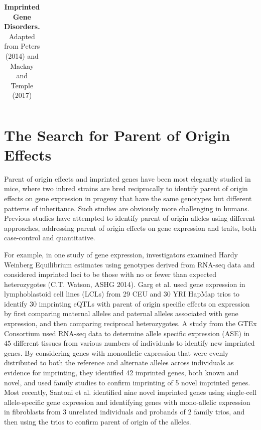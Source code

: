 \begin{table}
\begin{adjustbox}{width=1\textwidth}
\begin{tabular}{@{}p{3cm}p{2cm}p{7cm}p{7cm}@{}}
\bottomrule
\end{tabular}
\end{adjustbox}
\caption[Imprinted Gene Disorders.]{\textbf{Imprinted Gene Disorders.} Adapted from Peters (2014) and Mackay and Temple (2017) \cite{Peters2014,Mackay:2017kn}}
\label{tab:imprinteddisease}
\end{table}



\section{The Search for Parent of Origin Effects}


Parent of origin effects and imprinted genes have been most elegantly studied in mice, where two inbred strains are bred reciprocally to identify parent of origin effects on gene expression in progeny that have the same genotypes but different patterns of inheritance\cite{Babak2012}. Such studies are obviously more challenging in humans. Previous studies have attempted to identify parent of origin alleles using different approaches, addressing parent of origin effects on gene expression and traits, both case-control and quantitative.

For example, in one study of gene expression, investigators examined Hardy Weinberg Equilibrium estimates using genotypes derived from RNA-seq data and considered imprinted loci to be those with no or fewer than expected heterozygotes (C.T. Watson, ASHG 2014). Garg et al. used gene expression in lymphoblastoid cell lines (LCLs) from 29 CEU and 30 YRI HapMap trios to identify 30 imprinting eQTLs with parent of origin specific effects on expression by first comparing maternal alleles and paternal alleles associated with gene expression, and then comparing reciprocal heterozygotes\cite{Garg2012a}. A study from the GTEx Consortium used RNA-seq data to determine allele specific expression (ASE) in 45 different tissues from various numbers of individuals to identify new imprinted genes\cite{Baran:2015cx}. By considering genes with monoallelic expression that were evenly distributed to both the reference and alternate alleles across individuals as evidence for imprinting, they identified 42 imprinted genes, both known and novel, and used family studies to confirm imprinting of 5 novel imprinted genes. Most recently, Santoni et al. identified nine novel imprinted genes using single-cell allele-specific gene expression and identifying genes with mono-allelic expression in fibroblasts from 3 unrelated individuals and probands of 2 family trios, and then using the trios to confirm parent of origin of the alleles\cite{Santoni:2017hu}.

